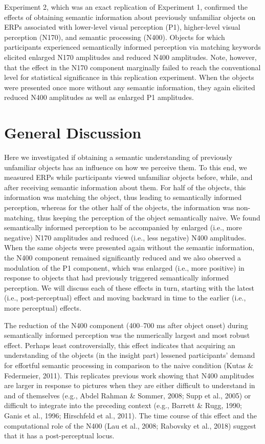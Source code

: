 \documentclass[
  english,
  man,floatsintext]{apa7}
\begin{document}
Experiment 2, which was an exact replication of Experiment 1, confirmed the effects of obtaining semantic information about previously unfamiliar objects on ERPs associated with lower-level visual perception (P1), higher-level visual perception (N170), and semantic processing (N400). Objects for which participants experienced semantically informed perception via matching keywords elicited enlarged N170 amplitudes and reduced N400 amplitudes. Note, however, that the effect in the N170 component marginally failed to reach the conventional level for statistical significance in this replication experiment. When the objects were presented once more without any semantic information, they again elicited reduced N400 amplitudes as well as enlarged P1 amplitudes.

\hypertarget{general-discussion}{%
\section{General Discussion}\label{general-discussion}}

Here we investigated if obtaining a semantic understanding of previously unfamiliar objects has an influence on how we perceive them. To this end, we measured ERPs while participants viewed unfamiliar objects before, while, and after receiving semantic information about them. For half of the objects, this information was matching the object, thus leading to semantically informed perception, whereas for the other half of the objects, the information was non-matching, thus keeping the perception of the object semantically naive. We found semantically informed perception to be accompanied by enlarged (i.e., more negative) N170 amplitudes and reduced (i.e., less negative) N400 amplitudes. When the same objects were presented again without the semantic information, the N400 component remained significantly reduced and we also observed a modulation of the P1 component, which was enlarged (i.e., more positive) in response to objects that had previously triggered semantically informed perception. We will discuss each of these effects in turn, starting with the latest (i.e., post-perceptual) effect and moving backward in time to the earlier (i.e., more perceptual) effects.

The reduction of the N400 component (400--700 ms after object onset) during semantically informed perception was the numerically largest and most robust effect. Perhaps least controversially, this effect indicates that acquiring an understanding of the objects (in the insight part) lessened participants' demand for effortful semantic processing in comparison to the naive condition (Kutas \& Federmeier, 2011). This replicates previous work showing that N400 amplitudes are larger in response to pictures when they are either difficult to understand in and of themselves (e.g., Abdel Rahman \& Sommer, 2008; Supp et al., 2005) or difficult to integrate into the preceding context (e.g., Barrett \& Rugg, 1990; Ganis et al., 1996; Hirschfeld et al., 2011). The time course of this effect and the computational role of the N400 (Lau et al., 2008; Rabovsky et al., 2018) suggest that it has a post-perceptual locus.
\end{document}
